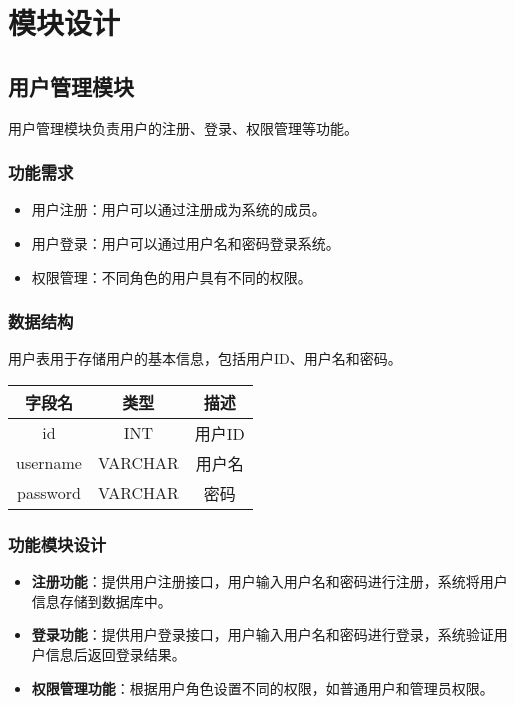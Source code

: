 \documentclass{ctexart}
\begin{document}
\section{模块设计}

\subsection{用户管理模块}
用户管理模块负责用户的注册、登录、权限管理等功能。

\subsubsection{功能需求}
\begin{itemize}
    \item 用户注册：用户可以通过注册成为系统的成员。
    \item 用户登录：用户可以通过用户名和密码登录系统。
    \item 权限管理：不同角色的用户具有不同的权限。
\end{itemize}

\subsubsection{数据结构}
用户表用于存储用户的基本信息，包括用户ID、用户名和密码。

\begin{center}
    \begin{tabular}{ccc}
        \toprule
        字段名      & 类型      & 描述   \\
        \midrule
        id       & INT     & 用户ID \\
        username & VARCHAR & 用户名  \\
        password & VARCHAR & 密码   \\
        \bottomrule
    \end{tabular}
\end{center}

\subsubsection{功能模块设计}
\begin{itemize}
    \item \textbf{注册功能}：提供用户注册接口，用户输入用户名和密码进行注册，系统将用户信息存储到数据库中。
    \item \textbf{登录功能}：提供用户登录接口，用户输入用户名和密码进行登录，系统验证用户信息后返回登录结果。
    \item \textbf{权限管理功能}：根据用户角色设置不同的权限，如普通用户和管理员权限。
\end{itemize}
\end{document}
